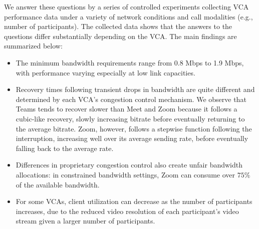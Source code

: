 We answer these questions by a series of controlled experiments collecting VCA performance data under a variety of network conditions and call modalities (e.g., number of participants). The collected data shows that the answers to the questions differ substantially depending on the VCA. The main findings are summarized below:%
\begin{itemize}[noitemsep]
    \item The minimum bandwidth requirements range from 0.8 Mbps to 1.9 Mbps, with performance varying especially at low link capacities. 
    \item Recovery times following transient drops in bandwidth are quite different and determined by each VCA's congestion control mechanism. We observe that Teams tends to recover slower than Meet and Zoom because it follows a cubic-like recovery, slowly increasing bitrate before eventually returning to the average bitrate. Zoom, however, follows a stepwise function following the interruption, increasing well over its average sending rate, before eventually falling back to the average rate.
    \item Differences in proprietary congestion control also create unfair bandwidth allocations: in constrained bandwidth settings, Zoom can consume over $75\%$ of the available bandwidth.
    \item For some VCAs, client utilization can decrease as the number of participants increases, due to the reduced video resolution of each participant's video stream given a larger number of participants.
\end{itemize}






